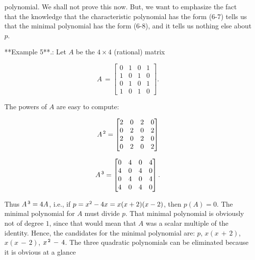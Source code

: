polynomial. We shall not prove this now. But, we want to emphasize the fact that the knowledge that the characteristic polynomial has the form (6-7) tells us that the minimal polynomial has the form (6-8), and it tells us nothing else about \(p\).

**Example 5**.: Let \(A\) be the \(4\times 4\) (rational) matrix

\[A\,=\begin{bmatrix}0&1&0&1\\ 1&0&1&0\\ 0&1&0&1\\ 1&0&1&0\end{bmatrix}.\]

The powers of \(A\) are easy to compute:

\[A^{\,\tt 2}=\begin{bmatrix}2&0&2&0\\ 0&2&0&2\\ 2&0&2&0\\ 0&2&0&2\end{bmatrix}\]

\[A^{\,\tt 3}=\begin{bmatrix}0&4&0&4\\ 4&0&4&0\\ 0&4&0&4\\ 4&0&4&0\end{bmatrix}.\]

Thus \(A^{\,\tt 3}=4A\), i.e., if \(p=x^{\tt 2}-4x=x(x+2)(x-2)\), then \(p(A)=0\). The minimal polynomial for \(A\) must divide \(p\). That minimal polynomial is obviously not of degree \(1\), since that would mean that \(A\) was a scalar multiple of the identity. Hence, the candidates for the minimal polynomial are: \(p\), \(x(x\,+\,2)\), \(x(x\,-\,2)\), \(x^{\,\tt 2}\,-\,4\). The three quadratic polynomials can be eliminated because it is obvious at a glance 
